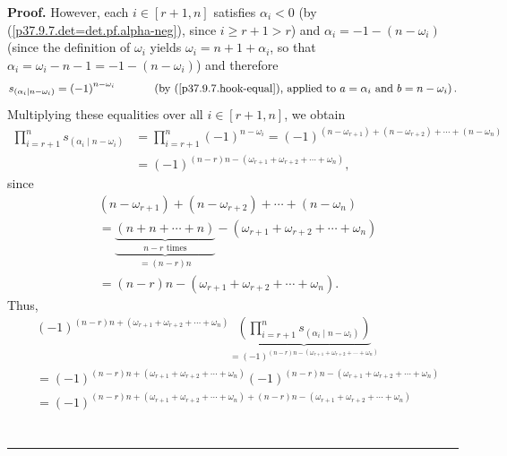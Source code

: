 \documentclass[numbers=enddot,12pt,final,onecolumn,notitlepage]{scrartcl}%
\theoremstyle{definition}
\newenvironment{proof}[1][Proof]{\noindent\textbf{#1.} }{\ \rule{0.5em}{0.5em}}
\let\prodnonlimits\prod
\renewcommand{\prod}{\prodnonlimits\limits}
\begin{document}
\begin{enumerate}
\begin{proof}
However, each $i\in\left[  r+1,n\right]  $ satisfies $\alpha_{i}<0$ (by
(\ref{p37.9.7.det=det.pf.alpha-neg}), since $i\geq r+1>r$) and $\alpha
_{i}=-1-\left(  n-\omega_{i}\right)  $ (since the definition of $\omega_{i}$
yields $\omega_{i}=n+1+\alpha_{i}$, so that $\alpha_{i}=\omega_{i}%
-n-1=-1-\left(  n-\omega_{i}\right)  $) and therefore
\[
s_{\left(  \alpha_{i}\mid n-\omega_{i}\right)  }=\left(  -1\right)
^{n-\omega_{i}}\ \ \ \ \ \ \ \ \ \ \left(  \text{by (\ref{p37.9.7.hook-equal}%
), applied to }a=\alpha_{i}\text{ and }b=n-\omega_{i}\right)  .
\]
Multiplying these equalities over all $i\in\left[  r+1,n\right]  $, we obtain%
\begin{align*}
\prod_{i=r+1}^{n}s_{\left(  \alpha_{i}\mid n-\omega_{i}\right)  }  &
=\prod_{i=r+1}^{n}\left(  -1\right)  ^{n-\omega_{i}}=\left(  -1\right)
^{\left(  n-\omega_{r+1}\right)  +\left(  n-\omega_{r+2}\right)
+\cdots+\left(  n-\omega_{n}\right)  }\\
&  =\left(  -1\right)  ^{\left(  n-r\right)  n-\left(  \omega_{r+1}%
+\omega_{r+2}+\cdots+\omega_{n}\right)  },
\end{align*}
since%
\begin{align*}
&  \left(  n-\omega_{r+1}\right)  +\left(  n-\omega_{r+2}\right)
+\cdots+\left(  n-\omega_{n}\right) \\
&  =\underbrace{\underbrace{\left(  n+n+\cdots+n\right)  }_{n-r\text{ times}}%
}_{=\left(  n-r\right)  n}-\left(  \omega_{r+1}+\omega_{r+2}+\cdots+\omega
_{n}\right) \\
&  =\left(  n-r\right)  n-\left(  \omega_{r+1}+\omega_{r+2}+\cdots+\omega
_{n}\right)  .
\end{align*}
Thus,
\begin{align*}
&  \left(  -1\right)  ^{\left(  n-r\right)  n+\left(  \omega_{r+1}%
+\omega_{r+2}+\cdots+\omega_{n}\right)  }\underbrace{\left(  \prod_{i=r+1}%
^{n}s_{\left(  \alpha_{i}\mid n-\omega_{i}\right)  }\right)  }_{=\left(
-1\right)  ^{\left(  n-r\right)  n-\left(  \omega_{r+1}+\omega_{r+2}%
+\cdots+\omega_{n}\right)  }}\\
&  =\left(  -1\right)  ^{\left(  n-r\right)  n+\left(  \omega_{r+1}%
+\omega_{r+2}+\cdots+\omega_{n}\right)  }\left(  -1\right)  ^{\left(
n-r\right)  n-\left(  \omega_{r+1}+\omega_{r+2}+\cdots+\omega_{n}\right)  }\\
&  =\left(  -1\right)  ^{\left(  n-r\right)  n+\left(  \omega_{r+1}%
+\omega_{r+2}+\cdots+\omega_{n}\right)  +\left(  n-r\right)  n-\left(
\omega_{r+1}+\omega_{r+2}+\cdots+\omega_{n}\right)  }\\

\end{align*}
\end{proof}
\end{enumerate}
\end{document}
